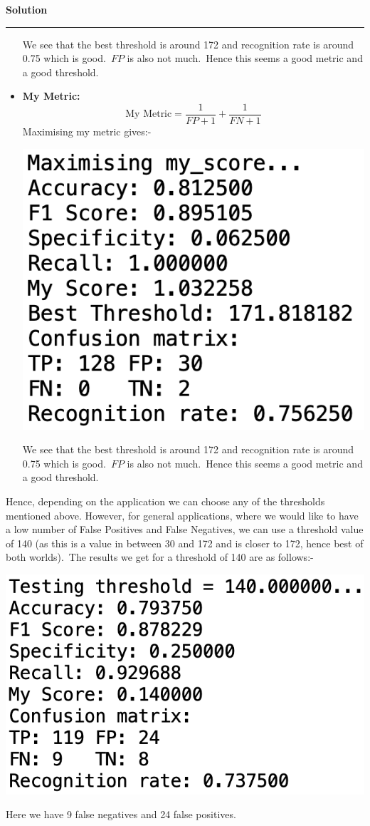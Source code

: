 \documentclass[a4paper,12pt]{article}
\newenvironment{solution}[2][]{%
    \begin{mdframed}[linecolor=blue!70!black, linewidth=2pt, roundcorner=10pt, backgroundcolor=yellow!10!white, skipabove=12pt, skipbelow=12pt]%
        \textbf{\large #2}
        \par\noindent\rule{\textwidth}{0.4pt}
}{
    \end{mdframed}
}
\begin{document}
\begin{solution}{Solution}
\begin{itemize}
\begin{center}
		\end{center}
		We see that the best threshold is around 172 and recognition rate is around 0.75 which is good.\ $FP$ is also not much.\ Hence this seems a good metric and a good threshold.
		\item \textbf{My Metric:}
		\[
			\text{My Metric} = \frac{1}{FP+1} + \frac{1}{FN+1}
		\]
		Maximising my metric gives:-
		\begin{center}
			\includegraphics[scale=0.5]{../images/my-metric.png}
		\end{center}
		We see that the best threshold is around 172 and recognition rate is around 0.75 which is good.\ $FP$ is also not much.\ Hence this seems a good metric and a good threshold.
	\end{itemize}
	Hence, depending on the application we can choose any of the thresholds mentioned above. However, for general applications, where we would like to have a low number of False Positives and False Negatives, we can use a threshold value of 140 (as this is a value in between 30 and 172 and is closer to 172, hence best of both worlds).\ The results we get for a threshold of 140 are as follows:-
	\begin{center}
		\includegraphics[scale=0.5]{../images/test.png}
	\end{center}
	Here we have 9 false negatives and 24 false positives.
\end{solution}
\end{document}
